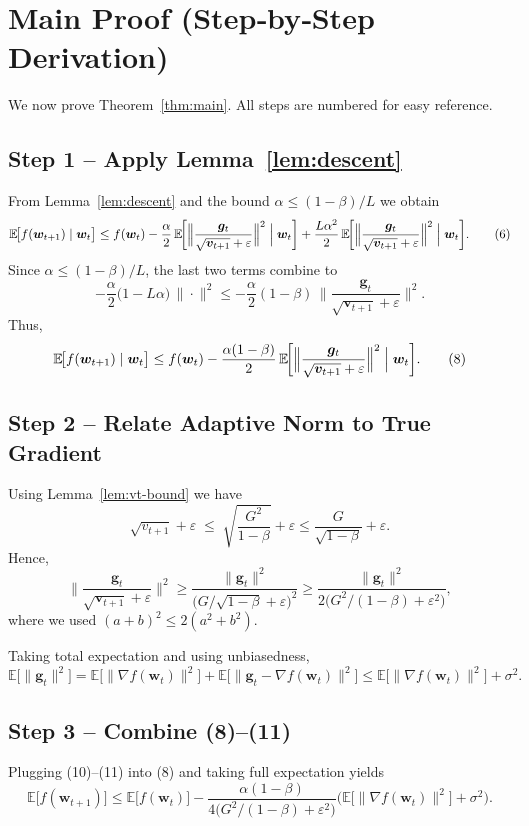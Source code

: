 \documentclass{article}
\newcommand{\E}{\mathbb{E}}
\begin{document}
\section*{Main Proof (Step‑by‑Step Derivation)}
We now prove Theorem~\ref{thm:main}.  All steps are numbered for easy reference.

\subsection*{Step 1 – Apply Lemma~\ref{lem:descent}}
From Lemma~\ref{lem:descent} and the bound $\alpha\le (1-\beta)/L$ we obtain
\[
\E\!\big[f(\bm w_{t+1})\mid\bm w_{t}\big]
\le f(\bm w_{t})-\frac{\alpha}{2}\,
\E\!\bigg[\Big\|\frac{\bm g_{t}}{\sqrt{\bm v_{t+1}}+\varepsilon}\Big\|^{2}\Bigm|\bm w_{t}\bigg]
+\frac{L\alpha^{2}}{2}\,
\E\!\bigg[\Big\|\frac{\bm g_{t}}{\sqrt{\bm v_{t+1}}+\varepsilon}\Big\|^{2}\Bigm|\bm w_{t}\bigg].
\tag{6}
\]
Since $\alpha\le (1-\beta)/L$, the last two terms combine to
\[
-\frac{\alpha}{2}\Big(1-L\alpha\Big)\,
\Big\|\cdot\Big\|^{2}
\le -\frac{\alpha}{2}(1-\beta)\,
\Big\|\frac{\bm g_{t}}{\sqrt{\bm v_{t+1}}+\varepsilon}\Big\|^{2}.
\tag{7}
\]
Thus,
\[
\E\!\big[f(\bm w_{t+1})\mid\bm w_{t}\big]
\le f(\bm w_{t})-\frac{\alpha(1-\beta)}{2}\,
\E\!\bigg[\Big\|\frac{\bm g_{t}}{\sqrt{\bm v_{t+1}}+\varepsilon}\Big\|^{2}\Bigm|\bm w_{t}\bigg].
\tag{8}
\]

\subsection*{Step 2 – Relate Adaptive Norm to True Gradient}
Using Lemma~\ref{lem:vt-bound} we have
\[
\sqrt{v_{t+1}}+\varepsilon\;\le\;\sqrt{\frac{G^{2}}{1-\beta}}+\varepsilon
\le \frac{G}{\sqrt{1-\beta}}+\varepsilon.
\tag{9}
\]
Hence,
\[
\Big\|\frac{\bm g_{t}}{\sqrt{\bm v_{t+1}}+\varepsilon}\Big\|^{2}
\ge
\frac{\|\bm g_{t}\|^{2}}{\big(G/\sqrt{1-\beta}+\varepsilon\big)^{2}}
\ge
\frac{\|\bm g_{t}\|^{2}}{2\big(G^{2}/(1-\beta)+\varepsilon^{2}\big)},
\tag{10}
\]
where we used $(a+b)^{2}\le2(a^{2}+b^{2})$.

Taking total expectation and using unbiasedness,
\[
\E\!\big[\|\bm g_{t}\|^{2}\big]
= \E\!\big[\|\nabla f(\bm w_{t})\|^{2}\big] + \E\!\big[\|\bm g_{t}-\nabla f(\bm w_{t})\|^{2}\big]
\le \E\!\big[\|\nabla f(\bm w_{t})\|^{2}\big] + \sigma^{2}.
\tag{11}
\]

\subsection*{Step 3 – Combine (8)–(11)}
Plugging (10)–(11) into (8) and taking full expectation yields
\[
\E\!\big[f(\bm w_{t+1})\big]
\le \E\!\big[f(\bm w_{t})\big]
-\frac{\alpha(1-\beta)}{4\big(G^{2}/(1-\beta)+\varepsilon^{2}\big)}
\Big(\E\!\big[\|\nabla f(\bm w_{t})\|^{2}\big]+\sigma^{2}\Big).
\tag{12}
\]
\end{document}

